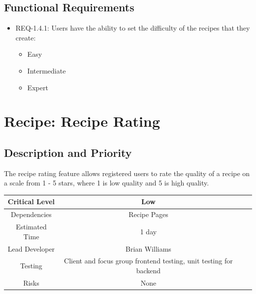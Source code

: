 \documentclass{scrreprt}
\begin{document}
\subsection{Functional Requirements}

\begin{itemize}
    \item REQ-1.4.1: Users have the ability to set the difficulty of the recipes that they create:
        \begin{itemize}
            \item Easy
            \item Intermediate
            \item Expert
        \end{itemize}
\end{itemize}

\section{Recipe: Recipe Rating}

\subsection{Description and Priority}

The recipe rating feature allows registered users to rate the quality of a recipe on a scale from 1 - 5 stars, where 1 is low quality and 5 is high quality.

\begin{center}
    \begin{tabular}{| c | c | c | c |}
        \hline
        Critical Level & Low                                                               \\
        \hline
        Dependencies   & Recipe Pages                                                      \\
        \hline
        Estimated Time & 1 day                                                             \\
        \hline
        Lead Developer & Brian Williams                                                    \\
        \hline
        Testing        & Client and focus group frontend testing, unit testing for backend \\
        \hline
        Risks          & None                                                              \\
        \hline
    \end{tabular}
\end{center}
\end{document}
